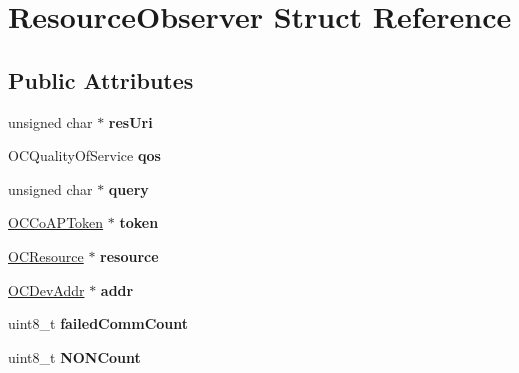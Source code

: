 \hypertarget{structResourceObserver}{}\section{Resource\+Observer Struct Reference}
\label{structResourceObserver}
\subsection*{Public Attributes}
\begin{DoxyCompactItemize}
\item 
\hypertarget{structResourceObserver_ad307af35ead65c7a0f568305f862078e}{}unsigned char $\ast$ {\bfseries res\+Uri}\label{structResourceObserver_ad307af35ead65c7a0f568305f862078e}

\item 
\hypertarget{structResourceObserver_aa46aa8ee5cfa8277d61847fdae677159}{}O\+C\+Quality\+Of\+Service {\bfseries qos}\label{structResourceObserver_aa46aa8ee5cfa8277d61847fdae677159}

\item 
\hypertarget{structResourceObserver_ab3bca4f19afda64b961b7d967ed8c2e0}{}unsigned char $\ast$ {\bfseries query}\label{structResourceObserver_ab3bca4f19afda64b961b7d967ed8c2e0}

\item 
\hypertarget{structResourceObserver_a02079e2dbddd041187509f32f582f099}{}\hyperlink{structOCCoAPToken}{O\+C\+Co\+A\+P\+Token} $\ast$ {\bfseries token}\label{structResourceObserver_a02079e2dbddd041187509f32f582f099}

\item 
\hypertarget{structResourceObserver_ad3c4e07e74eadb1c10052bdedb3e7120}{}\hyperlink{structrsrc__t}{O\+C\+Resource} $\ast$ {\bfseries resource}\label{structResourceObserver_ad3c4e07e74eadb1c10052bdedb3e7120}

\item 
\hypertarget{structResourceObserver_a4f24fd7e901a0b7d55ade2a961d249b1}{}\hyperlink{structOCDevAddr}{O\+C\+Dev\+Addr} $\ast$ {\bfseries addr}\label{structResourceObserver_a4f24fd7e901a0b7d55ade2a961d249b1}

\item 
\hypertarget{structResourceObserver_a38196bb7e261c2919ff875e7388c4e76}{}uint8\+\_\+t {\bfseries failed\+Comm\+Count}\label{structResourceObserver_a38196bb7e261c2919ff875e7388c4e76}

\item 
\hypertarget{structResourceObserver_abeef41f6410745a7a8ec2650d60a7981}{}uint8\+\_\+t {\bfseries N\+O\+N\+Count}\label{structResourceObserver_abeef41f6410745a7a8ec2650d60a7981}


\end{DoxyCompactItemize}
